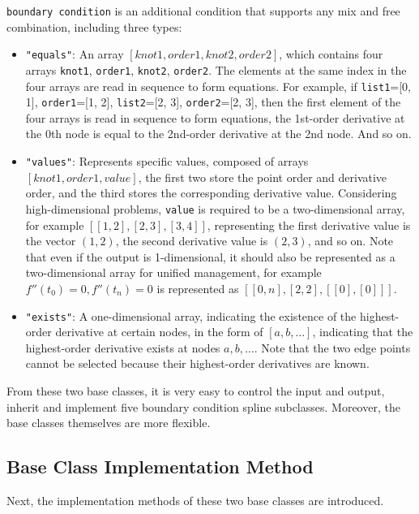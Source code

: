 \documentclass[a4paper]{article}
\begin{document}
\texttt{boundary condition} is an additional condition that supports any mix and free combination, including three types:

\begin{itemize}
    \item \texttt{"equals"}: An array \([knot1, order1, knot2, order2]\), which contains four arrays \texttt{knot1}, \texttt{order1}, \texttt{knot2}, \texttt{order2}. The elements at the same index in the four arrays are read in sequence to form equations. For example, if \texttt{list1}=[0, 1], \texttt{order1}=[1, 2], \texttt{list2}=[2, 3], \texttt{order2}=[2, 3], then the first element of the four arrays is read in sequence to form equations, the 1st-order derivative at the 0th node is equal to the 2nd-order derivative at the 2nd node. And so on.
    \item \texttt{"values"}: Represents specific values, composed of arrays \([knot1, order1, value]\), the first two store the point order and derivative order, and the third stores the corresponding derivative value. Considering high-dimensional problems, \texttt{value} is required to be a two-dimensional array, for example \([ [1, 2], [2, 3], [3, 4] ]\), representing the first derivative value is the vector \((1, 2)\), the second derivative value is \((2, 3)\), and so on. Note that even if the output is 1-dimensional, it should also be represented as a two-dimensional array for unified management, for example \(f''(t_0) = 0, f''(t_n) = 0\) is represented as \([ [0, n], [2, 2], [[0], [0]] ]\).
    \item \texttt{"exists"}: A one-dimensional array, indicating the existence of the highest-order derivative at certain nodes, in the form of \([a, b, \dots]\), indicating that the highest-order derivative exists at nodes \(a, b, \dots\). Note that the two edge points cannot be selected because their highest-order derivatives are known.
\end{itemize}

From these two base classes, it is very easy to control the input and output, inherit and implement five boundary condition spline subclasses. Moreover, the base classes themselves are more flexible.

\subsection*{Base Class Implementation Method}

Next, the implementation methods of these two base classes are introduced.
\end{document}
